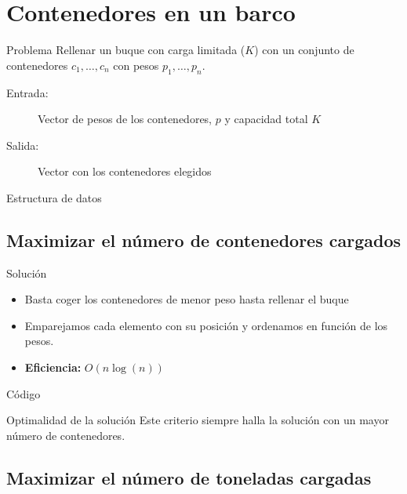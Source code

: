 \section{Contenedores en un barco}

\begin{frame}{Problema}
Rellenar un buque con carga limitada ($K$) con un conjunto
de contenedores $c_1,\dots, c_n$ con pesos $p_1, \dots, p_n$.

\begin{description}
 \item[Entrada:] Vector de pesos de los contenedores, $p$ y capacidad total $K$
 \item[Salida:] Vector con los contenedores elegidos
\end{description}
\end{frame}

\begin{frame}[fragile]{Estructura de datos}

\end{frame}

\subsection{Maximizar el número de contenedores cargados}

\begin{frame}{Solución}
\begin{itemize}
  \item Basta coger los contenedores de menor peso hasta rellenar el buque
  \item Emparejamos cada elemento con su posición y ordenamos en función de los pesos.
  \item \textbf{Eficiencia:} $O(n\log(n))$
\end{itemize}
\end{frame}

\begin{frame}[fragile]{Código}

\end{frame}

\begin{frame}{Optimalidad de la solución}
Este criterio siempre halla la solución con un mayor número de contenedores.
\end{frame}

\subsection{Maximizar el número de toneladas cargadas}

